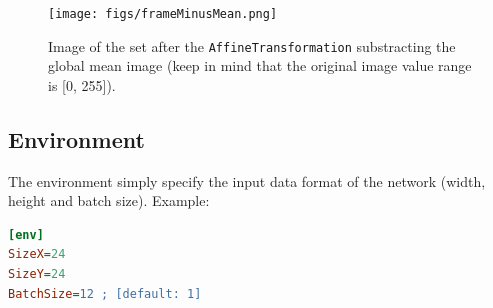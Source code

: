 \documentclass[a4paper,11pt,oneside]{article}
\begin{document}
\begin{figure}[!htb]
  \centering
  \texttt{[image: figs/frameMinusMean.png]}
  \caption{Image of the set after the \lstinline!AffineTransformation!
  substracting the global mean image (keep in mind that the original image
  value range is [0, 255]).}
  \label{fig:frameMinusMean}
\end{figure}


\subsection{Environment}

The environment simply specify the input data format of the network (width,
height and batch size). Example:
\begin{lstlisting}[language=ini]
[env]
SizeX=24
SizeY=24
BatchSize=12 ; [default: 1]
\end{lstlisting}
\end{document}
